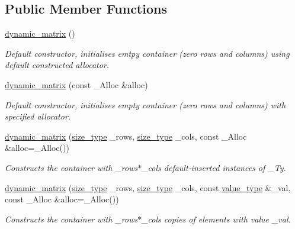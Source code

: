 \subsection*{Public Member Functions}
\begin{DoxyCompactItemize}
\item 
\hyperlink{classcrsc_1_1dynamic__matrix_af5e151a1f2383330d52175c27c7b1b31}{dynamic\+\_\+matrix} ()
\begin{DoxyCompactList}\small\item\em Default constructor, initialises emtpy container (zero rows and columns) using default constructed allocator. \end{DoxyCompactList}\item 
\hyperlink{classcrsc_1_1dynamic__matrix_a95a3a50291644b0b34dd411eb8ee7326}{dynamic\+\_\+matrix} (const \+\_\+\+Alloc \&alloc)
\begin{DoxyCompactList}\small\item\em Default constructor, initialises empty container (zero rows and columns) with specified allocator. \end{DoxyCompactList}\item 
\hyperlink{classcrsc_1_1dynamic__matrix_a17dd396f80824ba1b78e1a96cf357d7f}{dynamic\+\_\+matrix} (\hyperlink{classcrsc_1_1dynamic__matrix_a52b776dc7f60d8798c884d7d3c361a8a}{size\+\_\+type} \+\_\+rows, \hyperlink{classcrsc_1_1dynamic__matrix_a52b776dc7f60d8798c884d7d3c361a8a}{size\+\_\+type} \+\_\+cols, const \+\_\+\+Alloc \&alloc=\+\_\+\+Alloc())
\begin{DoxyCompactList}\small\item\em Constructs the container with {\ttfamily \+\_\+rows$\ast$\+\_\+cols} default-\/inserted instances of {\ttfamily \+\_\+\+Ty}. \end{DoxyCompactList}\item 
\hyperlink{classcrsc_1_1dynamic__matrix_ae3909bdbee24cba5d93e1f9d37dc8efa}{dynamic\+\_\+matrix} (\hyperlink{classcrsc_1_1dynamic__matrix_a52b776dc7f60d8798c884d7d3c361a8a}{size\+\_\+type} \+\_\+rows, \hyperlink{classcrsc_1_1dynamic__matrix_a52b776dc7f60d8798c884d7d3c361a8a}{size\+\_\+type} \+\_\+cols, const \hyperlink{classcrsc_1_1dynamic__matrix_a27b83d28002e3e2bb316f1f0460e9cca}{value\+\_\+type} \&\+\_\+val, const \+\_\+\+Alloc \&alloc=\+\_\+\+Alloc())
\begin{DoxyCompactList}\small\item\em Constructs the container with {\ttfamily \+\_\+rows$\ast$\+\_\+cols} copies of elements with value {\ttfamily \+\_\+val}. \end{DoxyCompactList}\item 

\end{DoxyCompactItemize}
